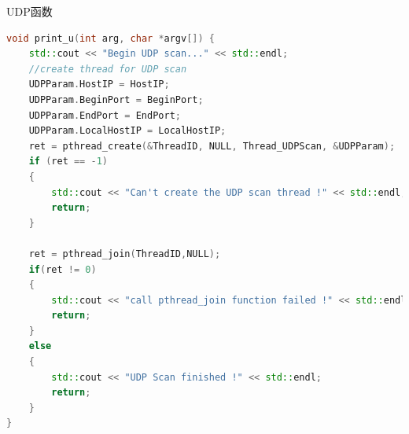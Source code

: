 \documentclass[UTF8,a4paper,10pt]{ctexart}
\begin{document}
UDP函数
\begin{lstlisting}[language = C++]
void print_u(int arg, char *argv[]) {
    std::cout << "Begin UDP scan..." << std::endl;
    //create thread for UDP scan
    UDPParam.HostIP = HostIP;
    UDPParam.BeginPort = BeginPort;
    UDPParam.EndPort = EndPort;
    UDPParam.LocalHostIP = LocalHostIP;
    ret = pthread_create(&ThreadID, NULL, Thread_UDPScan, &UDPParam);
    if (ret == -1) 
    {
        std::cout << "Can't create the UDP scan thread !" << std::endl;
        return;
    }

    ret = pthread_join(ThreadID,NULL);
    if(ret != 0)
    {
        std::cout << "call pthread_join function failed !" << std::endl;
        return;
    }
    else
    {
        std::cout << "UDP Scan finished !" << std::endl;
        return;
    }
}
\end{lstlisting}
\end{document}
